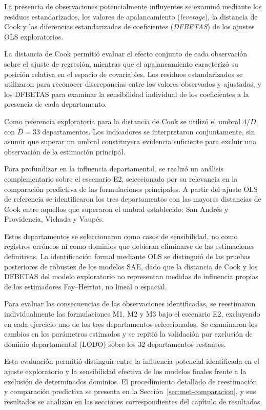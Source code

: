 La presencia de observaciones potencialmente influyentes se examinó mediante los residuos estandarizados, los valores de apalancamiento (\textit{leverage}), la distancia de Cook y las diferencias estandarizadas de coeficientes (\textit{DFBETAS}) de los ajustes OLS exploratorios.

La distancia de Cook permitió evaluar el efecto conjunto de cada observación sobre el ajuste de regresión, mientras que el apalancamiento caracterizó su posición relativa en el espacio de covariables. Los residuos estandarizados se utilizaron para reconocer discrepancias entre los valores observados y ajustados, y los DFBETAS para examinar la sensibilidad individual de los coeficientes a la presencia de cada departamento.

Como referencia exploratoria para la distancia de Cook se utilizó el umbral $4/D$, con $D=33$ departamentos. Los indicadores se interpretaron conjuntamente, sin asumir que superar un umbral constituyera evidencia suficiente para excluir una observación de la estimación principal.

Para profundizar en la influencia departamental, se realizó un análisis complementario sobre el escenario E2, seleccionado por su relevancia en la comparación predictiva de las formulaciones principales. A partir del ajuste OLS de referencia se identificaron los tres departamentos con las mayores distancias de Cook entre aquellos que superaron el umbral establecido: San Andrés y Providencia, Vichada y Vaupés.

Estos departamentos se seleccionaron como casos de sensibilidad, no como registros erróneos ni como dominios que debieran eliminarse de las estimaciones definitivas. La identificación formal mediante OLS se distinguió de las pruebas posteriores de robustez de los modelos SAE, dado que la distancia de Cook y los DFBETAS del modelo exploratorio no representan medidas de influencia propias de los estimadores Fay--Herriot, no lineal o espacial.

Para evaluar las consecuencias de las observaciones identificadas, se reestimaron individualmente las formulaciones M1, M2 y M3 bajo el escenario E2, excluyendo en cada ejercicio uno de los tres departamentos seleccionados. Se examinaron los cambios en los parámetros estimados y se repitió la validación por exclusión de dominio departamental (LODO) sobre los 32 departamentos restantes.

Esta evaluación permitió distinguir entre la influencia potencial identificada en el ajuste exploratorio y la sensibilidad efectiva de los modelos finales frente a la exclusión de determinados dominios. El procedimiento detallado de reestimación y comparación predictiva se presenta en la Sección~\ref{sec:met-comparacion}, y sus resultados se analizan en las secciones correspondientes del capítulo de resultados.

